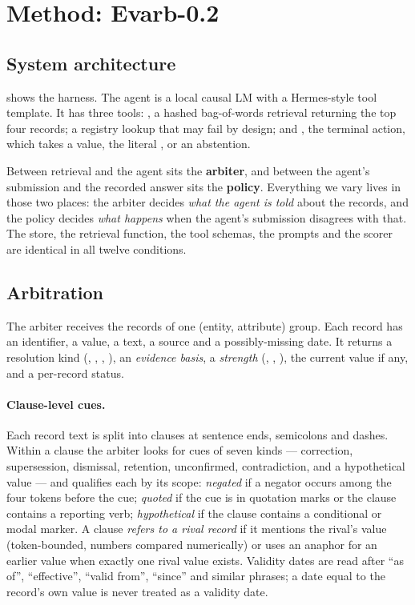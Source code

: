 \section{Method: Evarb-0.2}
\label{sec:method}



\subsection{System architecture}

 shows the harness. The agent is a local causal LM with a Hermes-style tool template. It
has three tools: , a hashed bag-of-words retrieval returning the top four records; a registry
lookup that may fail by design; and , the terminal action, which takes a value, the literal
, or an abstention.

Between retrieval and the agent sits the \textbf{arbiter}, and between the agent's submission and the recorded
answer sits the \textbf{policy}. Everything we vary lives in those two places: the arbiter decides \emph{what the
agent is told} about the records, and the policy decides \emph{what happens} when the agent's submission disagrees
with that. The store, the retrieval function, the tool schemas, the prompts and the scorer are identical in all
twelve conditions.

\subsection{Arbitration}

The arbiter receives the records of one (entity, attribute) group. Each record has an identifier, a value, a text,
a source and a possibly-missing  date. It returns a resolution kind (,
, , ), an \emph{evidence basis}, a \emph{strength}
(, , ), the current value if any, and a per-record status.

\paragraph{Clause-level cues.} Each record text is split into clauses at sentence ends, semicolons and dashes.
Within a clause the arbiter looks for cues of seven kinds --- correction, supersession, dismissal, retention,
unconfirmed, contradiction, and a hypothetical value --- and qualifies each by its scope: \emph{negated} if a
negator occurs among the four tokens before the cue; \emph{quoted} if the cue is in quotation marks or the clause
contains a reporting verb; \emph{hypothetical} if the clause contains a conditional or modal marker. A clause
\emph{refers to a rival record} if it mentions the rival's value (token-bounded, numbers compared numerically) or
uses an anaphor for an earlier value when exactly one rival value exists. Validity dates are read after ``as of'',
``effective'', ``valid from'', ``since'' and similar phrases; a date equal to the record's own value is never
treated as a validity date.


